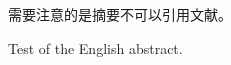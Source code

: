
\begin{cabstract}
	\pkuthssffaq %
	需要注意的是摘要不可以引用文献。
\end{cabstract}


\clearpage

\begin{eabstract}
	Test of the English abstract.
\end{eabstract}

